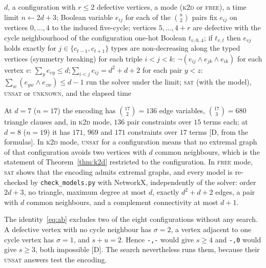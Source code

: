 \documentclass[11pt]{article}
\theoremstyle{remark}
\begin{document}
\begin{algorithm}[ht]
\caption{Configuration-split satisfiability search at fixed $d$.}\label{alg:sat}
\begin{algorithmic}[1]
\Require $d$, a configuration with $r\le2$ defective vertices, a mode (\textsc{k2d} or \textsc{free}), a time limit
\State $n\gets2d+3$; Boolean variable $e_{ij}$ for each of the $\binom n2$ pairs
\State fix $e_{ij}$ on vertices $0,\ldots,4$ to the induced five-cycle; vertices $5,\ldots,4+r$ are defective with the cycle neighbourhood of the configuration
  \State one-hot Boolean $t_{v,0..4}$; if $t_{v,t}$ then $e_{vj}$ holds exactly for $j\in\{c_{t-1},c_{t+1}\}$
\EndFor
\State types are non-decreasing along the typed vertices (symmetry breaking)
\State for each triple $i<j<k$: $\neg(e_{ij}\wedge e_{jk}\wedge e_{ik})$
\State for each vertex $v$: $\sum_ye_{vy}\le d$;\quad $\sum_{i<j}e_{ij}=d^2+d+2$
  \State for each pair $y<z$: $\sum_{w}(e_{yw}\wedge e_{zw})\le d-1$
\EndIf
\State run the solver under the limit; \Return \textsc{sat} (with the model), \textsc{unsat} or \textsc{unknown}, and the elapsed time
\end{algorithmic}
\end{algorithm}

At $d=7$ ($n=17$) the encoding has $\binom{17}2=136$ edge variables, $\binom{17}3=680$ triangle clauses and, in \textsc{k2d} mode, $136$ pair constraints over $15$ terms each; at $d=8$ ($n=19$) it has $171$, $969$ and $171$ constraints over $17$ terms [D, from the formulas]. In \textsc{k2d} mode, \textsc{unsat} for a configuration means that no extremal graph of that configuration avoids two vertices with $d$ common neighbours, which is the statement of Theorem~\ref{thm:k2d} restricted to the configuration. In \textsc{free} mode, \textsc{sat} shows that the encoding admits extremal graphs, and every model is re-checked by \texttt{check\_models.py} with NetworkX, independently of the solver: order $2d+3$, no triangle, maximum degree at most $d$, exactly $d^2+d+2$ edges, a pair with $d$ common neighbours, and a complement connectivity at most $d+1$.

The identity~\eqref{eq:ab} excludes two of the eight configurations without any search. A defective vertex with no cycle neighbour has $\sigma=2$, a vertex adjacent to one cycle vertex has $\sigma=1$, and $s+u=2$. Hence \texttt{-,-} would give $s\ge4$ and \texttt{-,0} would give $s\ge3$, both impossible [D]. The search nevertheless runs them, because their \textsc{unsat} answers test the encoding.
\end{document}
